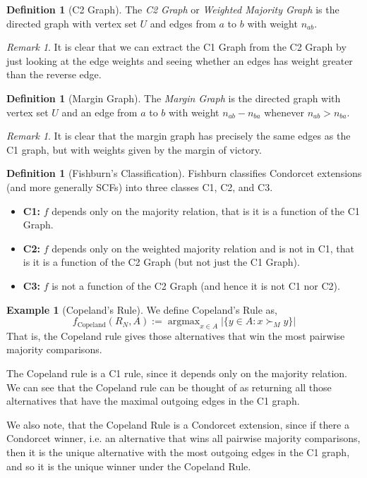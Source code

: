 \documentclass{book}
\theoremstyle{plain}
\theoremstyle{definition}
\newtheorem{definition}[theorem]{Definition}
\newtheorem{example}[theorem]{Example}
\theoremstyle{remark}
\newtheorem{remark}[theorem]{Remark}
\begin{document}
\begin{definition}[C2 Graph]
    The \emph{C2 Graph} or \emph{Weighted Majority Graph}
    is the directed graph with vertex set $U$ and
    edges from $a$ to $b$ with weight $n_{ab}$.
\end{definition}

\begin{remark}
    It is clear that 
    we can extract the 
    C1 Graph from the 
    C2 Graph by just looking at the edge weights
    and seeing whether an edges has weight greater than the reverse edge.
\end{remark}

\begin{definition}[Margin Graph]
    The \emph{Margin Graph} is the directed graph with vertex set $U$
    and an edge from 
    $a$ to $b$ with weight $n_{ab} - n_{ba}$
    whenever $n_{ab} > n_{ba}$.
\end{definition}

\begin{remark}
    It is clear that
    the margin graph has precisely the same edges as
    the C1 graph, but with weights given by the margin of victory.
\end{remark}

\begin{definition}[Fishburn's Classification]
    Fishburn classifies 
    Condorcet extensions 
    (and more generally SCFs)
    into three classes
    C1, C2, and C3.
    \begin{itemize}
        \item \textbf{C1:} $f$ depends only on the
        majority relation, that is it is a function of 
        the C1 Graph.
        \item \textbf{C2:} $f$ depends only on the
        weighted majority relation
        and is not in C1, that is it is a function of
        the C2 Graph (but not just the C1 Graph).
        \item \textbf{C3:} $f$ is 
        not a function of the C2 Graph (and hence it is not C1 nor C2).
    \end{itemize}
\end{definition}

\begin{example}[Copeland's Rule]
    We define Copeland's Rule as, 
    \[
        f_{\text{Copeland}}(R_N, A) := \operatorname{argmax}_{x \in A} |\{y \in A 
        : x \succ_M y\}|
    \]
    That is, the Copeland rule gives those alternatives that win 
    the most pairwise majority comparisons.
    
    The Copeland rule is a C1 rule, since it depends only on the majority relation.
    We can see that the Copeland rule can be thought of as returning all those 
    alternatives that have the maximal outgoing edges in the C1 graph.

    We also note, that the Copeland Rule is a Condorcet extension, 
    since if there a Condorcet winner, 
    i.e. an alternative that wins all pairwise majority comparisons, 
    then it is the unique alternative with the most outgoing edges in the C1 graph, and so it is the unique winner under the Copeland Rule.
\end{example}
\end{document}
